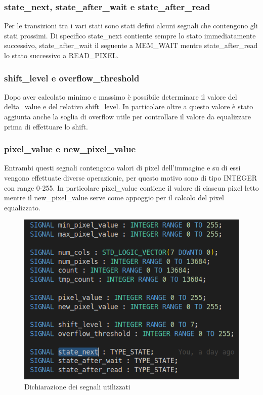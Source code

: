 \documentclass{article}
\begin{document}
\subsubsection{state\_next, state\_after\_wait e state\_after\_read}
Per le transizioni tra i vari stati sono stati defini alcuni segnali che contengono gli stati prossimi. Di specifico state\_next contiente sempre lo stato immediatamente successivo, state\_after\_wait il seguente a MEM\_WAIT mentre state\_after\_read lo stato successivo a READ\_PIXEL.

\pagebreak

\subsubsection{shift\_level e overflow\_threshold}
Dopo aver calcolato minimo e massimo è possibile determinare il valore del delta\_value e del relativo shift\_level. In particolare oltre a questo valore è stato aggiunta anche la soglia di overflow utile per controllare il valore da equalizzare prima di effettuare lo shift.


\subsubsection{pixel\_value e new\_pixel\_value}
Entrambi questi segnali contengono valori di pixel dell'immagine e su di essi vengono effettuate diverse operazionie, per questo motivo sono di tipo INTEGER con range 0-255. In particolare pixel\_value contiene il valore di ciascun pixel letto mentre il new\_pixel\_value serve come appoggio per il calcolo del pixel equalizzato.

\begin{figure}[h]
    \includegraphics[width=\textwidth]{signals.png}
    \centering
    \caption{Dichiarazione dei segnali utilizzati}
\end{figure}
\end{document}
